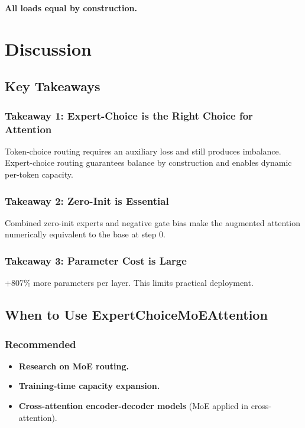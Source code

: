 \textbf{All loads equal by construction.}



\section{Discussion}

\subsection{Key Takeaways}

\subsubsection{Takeaway 1: Expert-Choice is the Right Choice for Attention}

Token-choice routing requires an auxiliary loss and still produces 
imbalance. Expert-choice routing guarantees balance by construction and 
enables dynamic per-token capacity.

\subsubsection{Takeaway 2: Zero-Init is Essential}

Combined zero-init experts and negative gate bias make the augmented 
attention numerically equivalent to the base at step 0.

\subsubsection{Takeaway 3: Parameter Cost is Large}

+807\% more parameters per layer. This limits practical deployment.

\subsection{When to Use ExpertChoiceMoEAttention}

\subsubsection{Recommended}
\begin{itemize}
\item \textbf{Research on MoE routing.}
\item \textbf{Training-time capacity expansion.}
\item \textbf{Cross-attention encoder-decoder models} (MoE applied in cross-attention).

\end{itemize}
